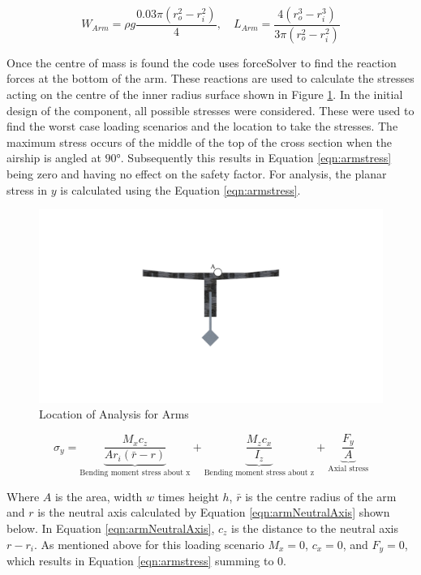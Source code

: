 \documentclass[../main.tex]{subfiles}
\begin{document}
\begin{equation} \label{eqn:armCg}
W_{Arm} = \rho g\frac{0.03\pi(r_o^2 - r_i^2)}{4}, \quad L_{Arm} =\frac{4(r_o^3 - r_i^3)}{3\pi(r_o^2 - r_i^2)}
\end{equation}

Once the centre of mass is found the code uses forceSolver to find the reaction forces at the bottom of the arm. These reactions are used to calculate the stresses acting on the centre of the inner radius surface shown in Figure \ref{fig:thrusterArmLoc}. In the initial design of the component, all possible stresses were considered. These were used to find the worst case loading scenarios and the location to take the stresses. The maximum stress occurs of the middle of the top of the cross section when the airship is angled at $90°$. Subsequently this results in Equation \ref{eqn:armstress} being zero and having no effect on the safety factor. For analysis, the planar stress in $y$ is calculated using the Equation \ref{eqn:armstress}.

\begin{figure}[H]
	\centering
	\includegraphics[width=.5\linewidth]{img/analysis/arm/armLocation.pdf}
	\caption{Location of Analysis for Arms}
	\label{fig:thrusterArmLoc}
\end{figure}

\begin{equation}
\label{eqn:armstress}
\sigma_{y}=  \underbrace{\frac{M_{x}c_z}{A r_i (\bar{r} - r)}}_\text{Bending moment stress about x} + \underbrace{\frac{M_{z}c_x}{I_z}}_\text{Bending moment stress about z} + \underbrace{\frac{F_y}{A}}_\text{Axial stress} 
\end{equation}

Where $A$ is the area, width $w$ times height $h$, $\bar{r}$ is the centre radius of the arm and $r$ is the neutral axis calculated by Equation \ref{eqn:armNeutralAxis} shown below. In Equation \ref{eqn:armNeutralAxis}, $c_z$ is the distance to the neutral axis $r - r_i$. As mentioned above for this loading scenario $M_x = 0$, $c_x = 0$, and $F_y = 0$, which results in Equation \ref{eqn:armstress} summing to 0.
\end{document}
